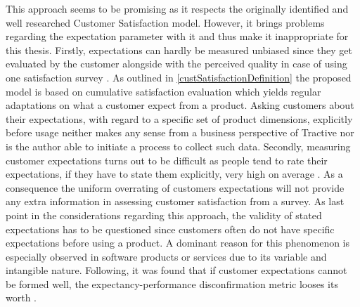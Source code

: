 This approach seems to be promising as it respects the originally identified and well researched Customer Satisfaction model. However, it brings problems regarding the expectation parameter with it and thus make it inappropriate for this thesis. Firstly, expectations can hardly be measured unbiased since they get evaluated by the customer alongside with the perceived quality in case of using one satisfaction survey \cite{getty1995relationship}. As outlined in \ref{custSatisfactionDefinition} the proposed model is based on cumulative satisfaction evaluation which yields regular adaptations on what a customer expect from a product. Asking customers about their expectations, with regard to a specific set of product dimensions, explicitly before usage neither makes any sense from a business perspective of Tractive nor is the author able to initiate a process to collect such data. Secondly, measuring customer expectations turns out to be difficult as people tend to rate their expectations, if they have to state them explicitly, very high on average \cite{babakus1992empirical}. As a consequence the uniform overrating of customers expectations will not provide any extra information in assessing customer satisfaction from a survey. As last point in the considerations regarding this approach, the validity of stated expectations has to be questioned since customers often do not have specific expectations before using a product. A dominant reason for this phenomenon is especially observed in software products or services due to its variable and intangible nature. Following, it was found that if customer expectations cannot be formed well, the expectancy-performance disconfirmation metric looses its worth \cite{halstead1994multisource}. 

